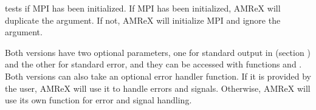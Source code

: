 \documentclass[letterpaper,10pt,english]{sphinxmanual}
\begin{document}
\begin{sphinxVerbatim}[commandchars=\\\{\}]
   
                    
                    
                    

       
                    
                     
                    
                    
                    
\end{sphinxVerbatim}

\sphinxAtStartPar
{} tests if MPI has been initialized.  If MPI has been
initialized, AMReX will duplicate the  argument.  If not,
AMReX will initialize MPI and ignore the  argument.

\sphinxAtStartPar
Both versions have two optional  parameters, one
for standard output in  (section {\hyperref[\detokenize{Basics:sec-basics-print}]{}})
and the other for standard error, and they can be accessed with
functions  and .  Both versions
can also take an optional error handler function.  If it is provided
by the user, AMReX will use it to handle errors and signals.
Otherwise, AMReX will use its own function for error and signal
handling.
\end{document}
